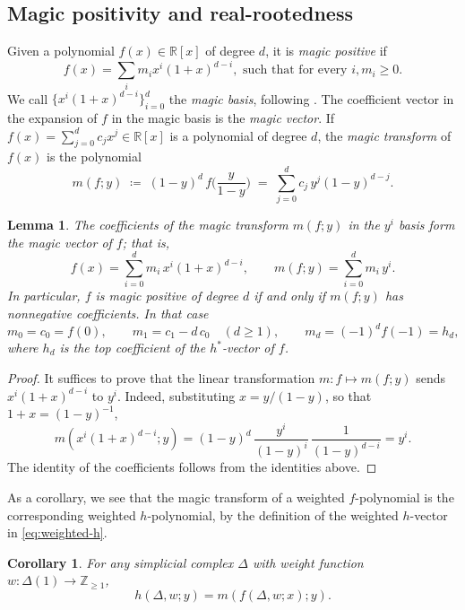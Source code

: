 \documentclass[11pt,a4paper,reqno]{amsart}
\theoremstyle{results}
\newtheorem{corollary}[thm]{Corollary}
\newtheorem{lemma}[thm]{Lemma}
\theoremstyle{definitions}
\def\Z{\mathbb{Z}}
\def\R{\mathbb{R}}
\def\Z{\mathbb{Z}}
\newcommand{\hstar}{h^{*}}
\begin{document}
\subsection{Magic positivity and real-rootedness}
\label{sec:prelim-poly}
Given a polynomial $f(x) \in \R[x]$ of degree $d$, it is \emph{magic positive} if
\[
f(x) = \sum_{i} m_i x^i(1+x)^{d-i}, \text{ such that for every } i,  m_i \geqslant 0.
\] We call $\{x^i(1+x)^{d-i}\}_{i=0}^{d}$ the \emph{magic basis}, following \cite{ferroni2024examples}.
The coefficient vector in the expansion of $f$ in the magic basis is the \emph{magic vector}.
If $f(x) = \sum_{j=0}^{d} c_j x^j \in \R[x]$ is a polynomial of degree $d$, the \emph{magic transform} of $f(x)$ is the polynomial
\begin{equation}\label{eq:magic}
  m(f; y) \;\coloneqq\; (1-y)^{d}\, f\!\Big(\frac{y}{1-y}\Big) \;=\; \sum_{j=0}^{d} c_j\, y^{j} (1-y)^{d-j}.
\end{equation}

\begin{lemma}\label{lem:magic-transform}
  The coefficients of the magic transform $m(f; y)$ in the $y^i$ basis form the magic vector of $f$; that is,
  \[
    f(x) = \sum_{i=0}^{d} m_i\, x^i (1+x)^{d-i}, \qquad
    m(f; y) = \sum_{i=0}^{d} m_i\, y^i.
  \]
  In particular, $f$ is magic positive of degree $d$ if and only if $m(f; y)$ has
  nonnegative coefficients.  In that case
  \[
  m_0 = c_0 = f(0), \qquad m_1 = c_1 - d\,c_0\quad(d\geqslant1), \qquad m_d = (-1)^d f(-1) = h_d ,
  \]
  where $h_d$ is the top coefficient of the $\hstar$-vector of $f$.
\end{lemma}

\begin{proof}
  It suffices to prove that the linear transformation $m \colon f \mapsto m(f; y)$ sends $x^{i}(1+x)^{d-i}$ to $y^i$.
  Indeed, substituting $x = y/(1-y)$, so that $1 + x = (1-y)^{-1}$,
  \[
  m (x^i (1+x)^{d-i}; y) = (1-y)^{d}\, \frac{y^i}{(1-y)^i}\, \frac{1}{(1-y)^{d-i}} = y^i.
  \]
  The identity of the coefficients follows from the identities above.
\end{proof}

As a corollary, we see that the magic transform
of a weighted $f$-polynomial is the corresponding weighted $h$-polynomial, by the definition of the weighted $h$-vector in \eqref{eq:weighted-h}.
\begin{corollary}\label{cor:magic-f-to-h}
For any simplicial complex $\Delta$ with weight function $w \colon \Delta(1) \to \Z_{\geqslant 1}$,
\[
h(\Delta, w; y) = m(f(\Delta, w; x);y).
\]
\end{corollary}
\end{document}
